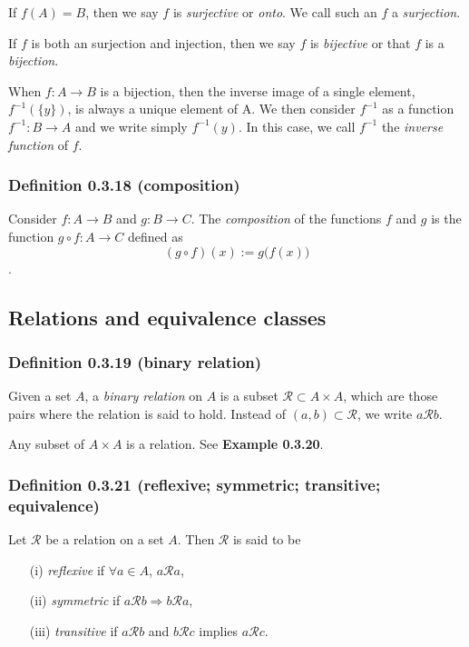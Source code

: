 \documentclass[12pt, letterpaper, oneside]{book}
\begin{document}
If $f(A) = B$, then we say $f$ is \textit{surjective} or \textit{onto}. We call
such an $f$ a \textit{surjection}.

If $f$ is both an surjection and injection, then we say $f$ is
\textit{bijective} or that $f$ is a \textit{bijection}.

When $f: A \rightarrow B$ is a bijection, then the inverse image of a single
element, $f^{-1}(\{y\})$, is always a unique element of A. We then consider
$f^{-1}$ as a function $f^{-1}: B \rightarrow A$ and we write simply
$f^{-1}(y)$. In this case, we call $f^{-1}$ the \textit{inverse function} of
$f$.

\subsubsection{Definition 0.3.18 (composition)}

Consider $f: A \rightarrow B$ and $g: B \rightarrow C$. The \textit{composition}
of the functions $f$ and $g$ is the function $g \circ f: A \rightarrow C$
defined as \[(g \circ f)(x) := g \bigl(f(x)\bigr)\].

\subsection{Relations and equivalence classes}

\subsubsection{Definition 0.3.19 (binary relation)}

Given a set $A$, a \textit{binary relation} on $A$ is a subset $\mathcal{R}
\subset A \times A$, which are those pairs where the relation is said to hold.
Instead of $(a, b) \subset \mathcal{R}$, we write $a \mathcal{R} b$.

Any subset of $A \times A$ is a relation. See \textbf{Example 0.3.20}.

\subsubsection{
  Definition 0.3.21 (reflexive; symmetric; transitive; equivalence)
}

Let $\mathcal{R}$ be a relation on a set $A$. Then $\mathcal{R}$ is said to be
\begin{enumerate}
  \item[(i)] \textit{reflexive} if $\forall a \in A$, $a \mathcal{R} a$,
  \item[(ii)] \textit{symmetric} if $a \mathcal{R} b \Rightarrow b \mathcal{R}
    a$,
  \item[(iii)] \textit{transitive} if $a \mathcal{R} b$ and $b \mathcal{R} c$
    implies $a \mathcal{R} c$.
\end{enumerate}
\end{document}
